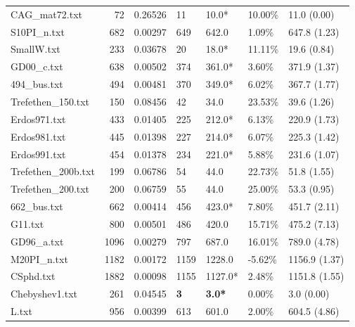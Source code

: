 \begin{table}[h]
\begin{tabular}{lrrllll}
 CAG_mat72.txt      &      72 &     0.26526 & 11           & 10.0*           & 10.00\%  & 11.0 (0.00)    \\
 S10PI_n.txt        &     682 &     0.00297 & 649          & 642.0           & 1.09\%   & 647.8 (1.23)   \\
 SmallW.txt         &     233 &     0.03678 & 20           & 18.0*           & 11.11\%  & 19.6 (0.84)    \\
 GD00_c.txt         &     638 &     0.00502 & 374          & 361.0*          & 3.60\%   & 371.9 (1.37)   \\
 494_bus.txt        &     494 &     0.00481 & 370          & 349.0*          & 6.02\%   & 367.7 (1.77)   \\
 Trefethen_150.txt  &     150 &     0.08456 & 42           & 34.0            & 23.53\%  & 39.6 (1.26)    \\
 Erdos971.txt       &     433 &     0.01405 & 225          & 212.0*          & 6.13\%   & 220.9 (1.73)   \\
 Erdos981.txt       &     445 &     0.01398 & 227          & 214.0*          & 6.07\%   & 225.3 (1.42)   \\
 Erdos991.txt       &     454 &     0.01378 & 234          & 221.0*          & 5.88\%   & 231.6 (1.07)   \\
 Trefethen_200b.txt &     199 &     0.06786 & 54           & 44.0            & 22.73\%  & 51.8 (1.55)    \\
 Trefethen_200.txt  &     200 &     0.06759 & 55           & 44.0            & 25.00\%  & 53.3 (0.95)    \\
 662_bus.txt        &     662 &     0.00414 & 456          & 423.0*          & 7.80\%   & 451.7 (2.11)   \\
 G11.txt            &     800 &     0.00501 & 486          & 420.0           & 15.71\%  & 475.2 (7.13)   \\
 GD96_a.txt         &    1096 &     0.00279 & 797          & 687.0           & 16.01\%  & 789.0 (4.78)   \\
 M20PI_n.txt        &    1182 &     0.00172 & 1159         & 1228.0          & -5.62\%  & 1156.9 (1.37)  \\
 CSphd.txt          &    1882 &     0.00098 & 1155         & 1127.0*         & 2.48\%   & 1151.8 (1.55)  \\
 Chebyshev1.txt     &     261 &     0.04545 & \textbf{3}   & \textbf{3.0*}   & 0.00\%   & 3.0 (0.00)     \\
 L.txt              &     956 &     0.00399 & 613          & 601.0           & 2.00\%   & 604.5 (4.86)   \\

\end{tabular}
\end{table}
